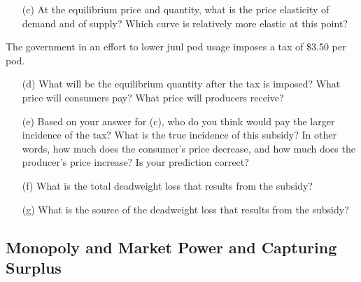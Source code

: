 \documentclass[11pt]{article}
\begin{document}
\begin{enumerate}
\begin{enumerate}
    \item[(c)] At the equilibrium price and quantity, what is the price elasticity of demand and of supply? Which curve is relatively more elastic at this point?
  \end{enumerate}

  The government in an effort to lower juul pod usage imposes a tax of \$3.50 per pod. 
  
  \begin{enumerate}
    \item[(d)] What will be the equilibrium quantity after the tax is imposed? What price will consumers pay? What price will producers receive?
    
    \item[(e)] Based on your answer for (c), who do you think would pay the larger incidence of the tax? What is the true incidence of this subsidy? In other words, how much does the consumer's price decrease, and how much does the producer's price increase? Is your prediction correct?

    \item[(f)] What is the total deadweight loss that results from the subsidy?

    \item[(g)] What is the source of the deadweight loss that results from the subsidy?
  \end{enumerate}
\end{enumerate}

\subsection*{Monopoly and Market Power and Capturing Surplus}
\end{document}
